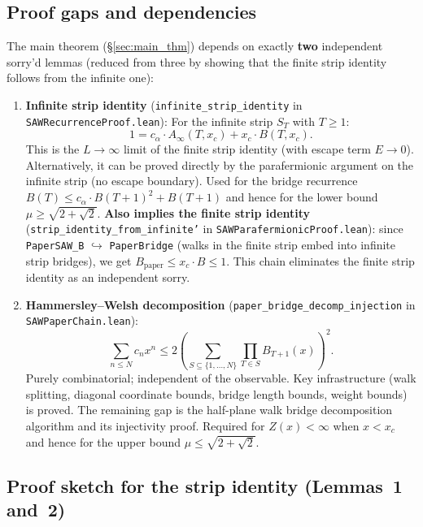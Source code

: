 \begin{lemma}
\section{Proof gaps and dependencies}\label{sec:gaps}

The main theorem (\S\ref{sec:main_thm}) depends on exactly
\textbf{two} independent sorry'd lemmas (reduced from three by
showing that the finite strip identity follows from the infinite one):

\begin{enumerate}
\item \textbf{Infinite strip identity}
  (\texttt{infinite\_strip\_identity} in
  \texttt{SAWRecurrenceProof.lean}):
  For the infinite strip $S_T$ with $T \ge 1$:
  \[
    1 = c_\alpha \cdot A_\infty(T, x_c) + x_c \cdot B(T, x_c).
  \]
  This is the $L \to \infty$ limit of the finite strip identity
  (with escape term $E \to 0$). Alternatively, it can be proved
  directly by the parafermionic argument on the infinite strip
  (no escape boundary). Used for the bridge recurrence
  $B(T) \le c_\alpha \cdot B(T{+}1)^2 + B(T{+}1)$ and hence for
  the lower bound $\mu \ge \sqrt{2+\sqrt{2}}$.
  \textbf{Also implies the finite strip identity}
  (\texttt{strip\_identity\_from\_infinite'} in
  \texttt{SAWParafermionicProof.lean}):
  since \texttt{PaperSAW\_B} $\hookrightarrow$
  \texttt{PaperBridge} (walks in the finite strip embed into infinite
  strip bridges), we get $B_{\text{paper}} \le x_c \cdot B \le 1$.
  This chain eliminates the finite strip identity as an independent sorry.

\item \textbf{Hammersley--Welsh decomposition}
  (\texttt{paper\_bridge\_decomp\_injection} in
  \texttt{SAWPaperChain.lean}):
  \[
    \sum_{n \leq N} c_n x^n \leq 2 \left(
    \sum_{S \subseteq \{1,\ldots,N\}}
    \prod_{T \in S} B_{T+1}(x)\right)^{\!2}.
  \]
  Purely combinatorial; independent of the observable.
  Key infrastructure (walk splitting, diagonal coordinate bounds,
  bridge length bounds, weight bounds) is proved.
  The remaining gap is the half-plane walk bridge decomposition
  algorithm and its injectivity proof.
  Required for $Z(x) < \infty$ when $x < x_c$ and hence for
  the upper bound $\mu \le \sqrt{2+\sqrt{2}}$.
\end{enumerate}

\subsection*{Proof sketch for the strip identity (Lemmas~1 and~2)}


\end{lemma}
